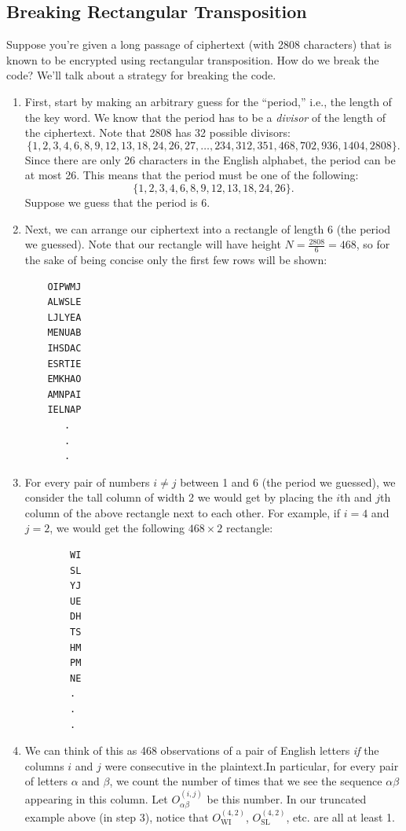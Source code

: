 \documentclass[letterpaper]{article}
\newcommand{\0}{\mathbf{0}}
\begin{document}
\subsection{Breaking Rectangular Transposition}
Suppose you're given a long passage of ciphertext (with 2808 characters) that is known to be encrypted using rectangular transposition. How do we break the code? We'll talk about a strategy for breaking the code. 
\begin{enumerate}
    \item First, start by making an arbitrary guess for the ``period,'' i.e., the length of the key word. We know that the period has to be a \emph{divisor} of the length of the ciphertext. Note that 2808 has 32 possible divisors: 
    \[\{1,2,3,4,6,8,9,12,13,18,24,26,27,\hdots,234,312,351,468,702,936,1404,2808\}.\]
    Since there are only 26 characters in the English alphabet, the period can be at most 26. This means that the period must be one of the following: 
    \[\{1,2,3,4,6,8,9,12,13,18,24,26\}.\]
    Suppose we guess that the period is 6.

    \item Next, we can arrange our ciphertext into a rectangle of length 6 (the period we guessed). Note that our rectangle will have height $N = \frac{2808}{6} = 468$, so for the sake of being concise only the first few rows will be shown: 
    \begin{verbatim}
    OIPWMJ
    ALWSLE
    LJLYEA
    MENUAB
    IHSDAC
    ESRTIE
    EMKHAO
    AMNPAI
    IELNAP
       .
       .
       .\end{verbatim}

    \item For every pair of numbers $i \neq j$ between 1 and 6 (the period we guessed), we consider the tall column of width 2 we would get by placing the $i$th and $j$th column of the above rectangle next to each other. For example, if $i = 4$ and $j = 2$, we would get the following $468 \times 2$ rectangle:
    \begin{verbatim}
        WI
        SL
        YJ
        UE
        DH
        TS
        HM
        PM
        NE
        .
        .
        .\end{verbatim}


    \item We can think of this as 468 observations of a pair of English letters \emph{if} the columns $i$ and $j$ were consecutive in the plaintext.In particular, for every pair of letters $\alpha$ and $\beta$, we count the number of times that we see the sequence $\alpha \beta$ appearing in this column. Let $O_{\alpha\beta}^{(i, j)}$ be this number. In our truncated example above (in step 3), notice that $O_{\text{WI}}^{(4, 2)}$, $O_{\text{SL}}^{(4, 2)}$, etc. are all at least 1.
    

\end{enumerate}
\end{document}
